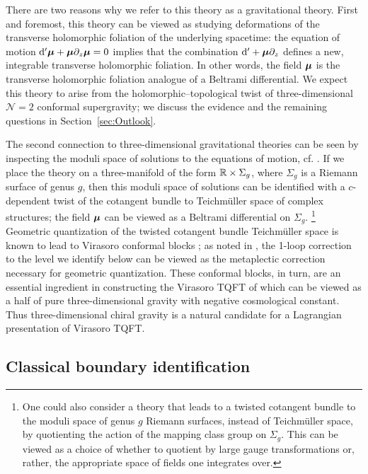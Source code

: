 \documentclass[11pt]{amsart}
\numberwithin{equation}{section}
\numberwithin{figure}{section}
\numberwithin{table}{section}
\begin{document}
There are two reasons why we refer to this theory as a gravitational theory.
First and foremost, this theory can be viewed as studying deformations of the transverse holomorphic foliation of the underlying spacetime: the equation of motion $\mathrm{d}' \boldsymbol{\mu} + \boldsymbol{\mu} \partial_z \boldsymbol{\mu} = 0$ implies that the combination $\mathrm{d}' + \boldsymbol{\mu} \partial_z$ defines a new, integrable transverse holomorphic foliation.
In other words, the field $\boldsymbol{\mu}$ is the transverse holomorphic foliation analogue of a Beltrami differential.
We expect this theory to arise from the holomorphic--topological twist of three-dimensional $\mathcal N=2$ conformal supergravity; we discuss the evidence and the remaining questions in Section~\ref{sec:Outlook}.

The second connection to three-dimensional gravitational theories can be seen by inspecting the moduli space of solutions to the equations of motion, cf. \cite[Sec.~3.2]{Khan:2025rah}.
If we place the theory on a three-manifold of the form ${\mathbb R} \times \Sigma_g$, where $\Sigma_g$ is a Riemann surface of genus $g$, then this moduli space of solutions can be identified with a $c$-dependent twist of the cotangent bundle to Teichm\"{u}ller space of complex structures; the field $\boldsymbol{\mu}$ can be viewed as a Beltrami differential on $\Sigma_g$.%
%
\footnote{One could also consider a theory that leads to a twisted cotangent bundle to the moduli space of genus $g$ Riemann surfaces, instead of Teichm\"{u}ller space, by quotienting the action of the mapping class group on $\Sigma_g$. This can be viewed as a choice of whether to quotient by large gauge transformations or, rather, the appropriate space of fields one integrates over.} %
%
Geometric quantization of the twisted cotangent bundle Teichm\"{u}ller space is known to lead to Virasoro conformal blocks \cite{Verlinde:1989ua, Teschner:2003em}; as noted in \cite{Khan:2025rah}, the 1-loop correction to the level we identify below can be viewed as the metaplectic correction necessary for geometric quantization.
These conformal blocks, in turn, are an essential ingredient in constructing the Virasoro TQFT of \cite{Collier:2023fwi, Collier:2024mgv} which can be viewed as a half of pure three-dimensional gravity with negative cosmological constant.
Thus three-dimensional chiral gravity is a natural candidate for a Lagrangian presentation of Virasoro TQFT.

\subsection{Classical boundary identification}\label{sec:ClassicalIdentification}
\end{document}
